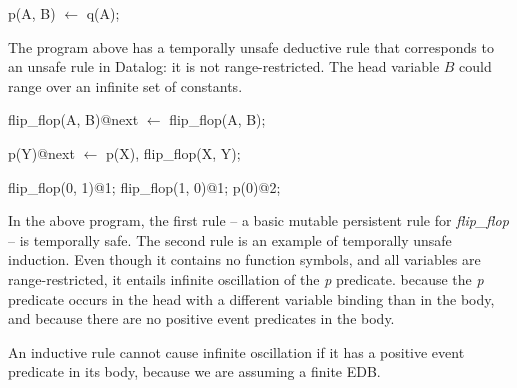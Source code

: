 \begin{example}

\begin{Dedalus}
p(A, B) \(\leftarrow\) q(A);
\end{Dedalus}

The program above has a temporally unsafe deductive rule that corresponds to an unsafe rule in Datalog: it is not range-restricted.  
The head variable $B$ could range over an infinite set of constants.

\end{example}


\begin{example}


\begin{Dedalus}
flip\_flop(A, B)@next \(\leftarrow\) flip\_flop(A, B);

p(Y)@next \(\leftarrow\) p(X), flip\_flop(X, Y);

flip\_flop(0, 1)@1;
flip\_flop(1, 0)@1;
p(0)@2;
\end{Dedalus}

In the above program, the first rule -- a basic mutable persistent rule for
\emph{flip\_flop} -- is temporally safe.  The second rule is an example of
temporally unsafe induction.  Even though it contains no function symbols, and
all variables are range-restricted, it entails infinite oscillation of
the \emph{p} predicate.
because the \emph{p} predicate occurs in the head with
a different variable binding than in the body, and because there are no
positive event predicates in the body.  

\end{example}


An inductive rule cannot cause infinite oscillation if it has a positive event predicate in its body, because we are assuming a finite EDB.



